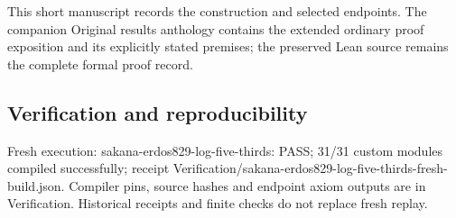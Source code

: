 \documentclass[11pt,a4paper]{article}
\begin{document}
{\small This short manuscript records the construction and selected endpoints. The companion Original results anthology contains the extended ordinary proof exposition and its explicitly stated premises; the preserved Lean source remains the complete formal proof record.\par}

\subsection{Verification and reproducibility}
Fresh execution: sakana-erdos829-log-five-thirds: PASS; 31/31 custom modules compiled successfully; receipt Verification/sakana-erdos829-log-five-thirds-fresh-build.json. Compiler pins, source hashes and endpoint axiom outputs are in Verification. Historical receipts and finite checks do not replace fresh replay.
\end{document}
